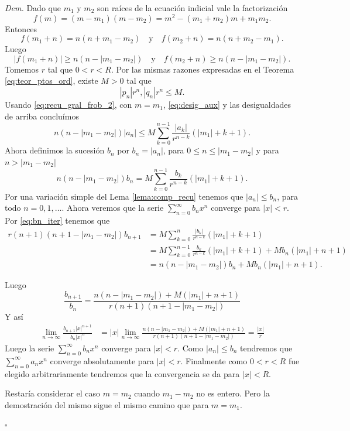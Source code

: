 \documentclass{article}
\newenvironment{demo}{\noindent\emph{Dem.}}{$\square$ \newline\vspace{5pt}}
\begin{document}
\begin{demo} Dado que $m_1$ y $m_2$ son raíces de la ecuación indicial vale la factorización
\[f(m)=(m-m_1)(m-m_2)=m^2-(m_1+m_2)m+m_1m_2.\]
Entonces
\[f(m_1+n)=n(n+m_1-m_2)\quad\text{y}\quad f(m_2+n)=n(n+m_2-m_1).\]
Luego
\begin{equation}\label{eq:desig_aux}|f(m_1+n)|\geq n(n-|m_1-m_2|)\quad\text{y}\quad f(m_2+n)\geq n(n-|m_1-m_2|).
\end{equation}
Tomemos $r$ tal que $0<r<R$. Por las mismas razones expresadas  en el Teorema \eqref{eq:teor_ptos_ord},  existe $M>0$ tal que
\[ |p_n|r^n,|q_n|r^n\leq M.\]
Usando \eqref{eq:recu_gral_frob_2}, con $m=m_1$, \eqref{eq:desig_aux} y las desigualdades de arriba concluímos
\[n(n-|m_1-m_2|)|a_n|\leq M\sum_{k=0}^{n-1}\frac{|a_k|}{r^{n-k}}(|m_1|+k+1).\]
Ahora definimos la sucesión $b_n$ por $b_n=|a_n|$, para $0\leq n\leq|m_1-m_2|$ y para $ n>|m_1-m_2|$
\begin{equation}\label{eq:bn_iter}n(n-|m_1-m_2|)b_n= M\sum_{k=0}^{n-1}\frac{b_k}{r^{n-k}}(|m_1|+k+1).\end{equation}
Por una variación simple  del Lema \ref{lema:comp_recu} tenemos que $|a_n|\leq b_n$, para todo $n=0,1,\ldots$. Ahora veremos que la serie $\sum_{n=0}^{\infty}b_nx^n$ converge para  $|x|<r$. Por \eqref{eq:bn_iter} tenemos que
\[ 
   \begin{split}
     r(n+1)(n+1-|m_1-m_2|)b_{n+1}&=M\sum_{k=0}^{n}\frac{|b_k|}{r^{n-k}}(|m_1|+k+1)\\
&=M\sum_{k=0}^{n-1}\frac{b_k}{r^{n-k}}(|m_1|+k+1)+Mb_n(|m_1|+n+1)\\
&=n(n-|m_1-m_2|)b_n+Mb_n(|m_1|+n+1).
  \end{split}
\]

Luego
\[\frac{b_{n+1}}{b_n}=\frac{ n(n-|m_1-m_2|)+M(|m_1|+n+1) }{ r(n+1)(n+1-|m_1-m_2|)  }\]
Y así
\[ \begin{split}
\lim_{n\to\infty}\frac{b_{n+1}|x|^{n+1}}{b_n|x|^n}&=|x|\lim_{n\to\infty}\frac{ n(n-|m_1-m_2|)+M(|m_1|+n+1) }{ r(n+1)(n+1-|m_1-m_2|)  }=\frac{|x|}{r}
\end{split}
\]
Luego la serie  $\sum_{n=0}^{\infty}b_nx^n$   converge para $|x|<r$. Como $|a_n|\leq b_n$ tendremos que  $\sum_{n=0}^{\infty}a_nx^n$ converge absolutamente para $|x|<r$. Finalmente como $0<r<R$ fue elegido arbitrariamente tendremos que la convergencia se da para $|x|<R$. 

Restaría considerar el caso $m=m_2$ cuando $m_1-m_2$ no es entero. Pero la demostración del mismo sigue el mismo camino que para $m=m_1$.

\end{demo}
\end{document}
